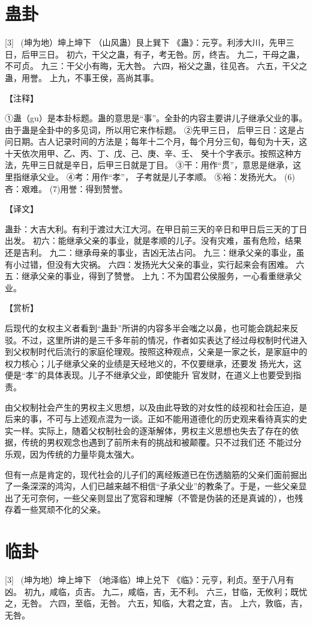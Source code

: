 \documentclass[12pt,UTF8]{ctexbook}
\begin{document}
\chapter{蛊卦}
[3] \ (坤为地）坤上坤下
（山风蛊）艮上巽下
《蛊》：元亨。利涉大川，先甲三日，后甲三日。
初六，干父之蛊，有子，考无咎。厉，终吉。
九二，干母之蛊，不可贞。
九三：干父小有晦，无大咎。
六四，裕父之蛊，往见吝。
六五，干父之蛊，用誉。
上九，不事王侯，高尚其事。

【注释】

①蛊（gu）是本卦标题。蛊的意思是“事”。全卦的内容主要讲儿子继承父业的事。由于蛊是全卦中的多见词，所以用它来作标题。
②先甲三日， 后甲三日：这是占问日期。古人记录时间的方法是；每年十二个月，每个月分三旬，每旬为十天，这十天依次用甲、乙、丙、丁、戊、己、庚、辛、壬、 癸十个字表示。按照这种方法，先甲三日就是辛日，后甲三日就是丁目。
③干：用作“贯”，意思是继承，这里指继承父业。
④考：用作“孝”， 子考就是儿子孝顺。
⑤裕：发扬光大。
(6)吝：艰难。
(7)用誉：得到赞誉。

【译文】

蛊卦：大吉大利。有利于渡过大江大河。在甲日前三天的辛日和甲日后三天的丁日出发。
初六：能继承父亲的事业，就是孝顺的儿子。没有灾难，虽有危险，结果还是吉利。
九二：继承母亲的事业，吉凶无法占问。
九三：继承父亲的事业，虽有小过错，但没有大灾祸。
六四：发扬光大父亲的事业，实行起来会有困难。
六五：继承父亲的事业，得到了赞誉。
上九：不为国君公侯服务，一心看重继承父业。

【赏析】

后现代的女权主义者看到“蛊卦”所讲的内容多半会嗤之以鼻，也可能会跳起来反驳。不过，这里所讲的是三千多年前的情况，作者如实表达了经过母权制时代进入到父权制时代后流行的家庭伦理观。按照这种观点，父亲是一家之长，是家庭中的权力核心；儿子继承父亲的业绩是天经地义的，不仅要继承，还要发 扬光大，这便是“孝”的具体表现。儿子不继承父业，即使能升 官发财，在道义上也要受到指责。

由父权制社会产生的男权主义思想，以及由此导致的对女性的歧视和社会压迫，是后来的事，不可与上述观点混为一谈。正如不能用道德化的历史观来看待真实的史实一样。实际上，随着父权制社会的逐渐解体，男权主义思想也失去了存在的依据，传统的男权观念也遇到了前所未有的挑战和被颠覆。只不过我们还 不能过分乐观，因为传统的力量毕竟太强大。

但有一点是肯定的，现代社会的儿子们的离经叛道已在伤透脑筋的父亲们面前掘出了一条深深的鸿沟，人们已越来越不相信“子承父业”的教条了。于是，一些父亲显出了无可奈何，一些父亲则显出了宽容和理解（不管是伪装的还是真诚的），也残存着一些冥顽不化的父亲。

\chapter{临卦}
[3] \ (坤为地）坤上坤下
（地泽临）坤上兑下
《临》：元亨，利贞。至于八月有凶。
初九，咸临，贞吉。
九二，咸临，吉，无不利。
六三，甘临，无攸利；既忧之，无咎。
六四，至临，无咎。
六五，知临，大君之宜，吉。
上六，敦临，吉，无咎。
\end{document}
